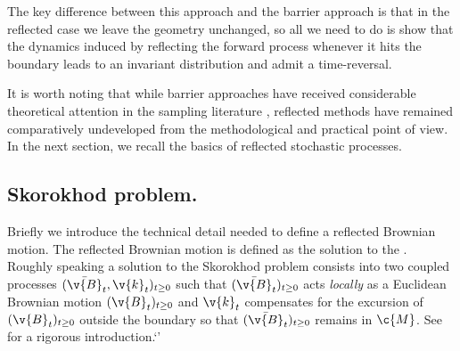 The key difference between this approach and the barrier approach is that in the reflected case we leave the geometry unchanged, so all we need to do is show that the dynamics induced by reflecting the forward process whenever it hits the boundary leads to an invariant distribution and admit a time-reversal.

It is worth noting that while barrier approaches have received considerable theoretical attention in the sampling literature \parencite{lee2017Geodesic, noble2022Barrier}, reflected methods have remained comparatively undeveloped from the methodological and practical point of view.
In the next section, we recall the basics of reflected stochastic processes.

\subsection{Skorokhod problem.}
Briefly we introduce the technical detail needed to define a reflected Brownian motion.
The reflected Brownian motion is defined as the solution to the .
Roughly speaking a solution to the Skorokhod problem consists into two coupled processes \((\bar{ \v{B}}_t, \v{k}_t)_{t \geq 0}\) such that \((\bar{ \v{B}}_t)_{t \geq 0}\) acts \emph{locally} as a Euclidean Brownian motion \(( \v{B}_t)_{t \geq 0}\) and \( \v{k}_t\) compensates for the excursion of \(( \v{B}_t)_{t \geq 0}\) outside the boundary so that \((\bar{ \v{B}}_t)_{t \geq 0}\) remains in \(\c{M}\).
See  for a rigorous introduction.`'

